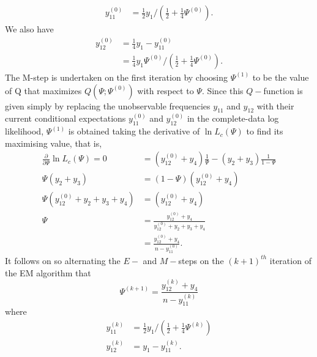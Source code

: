 \begin{exam}
\begin{align*}
        y_{11}^{(0)} & = \frac{1}{2} y_{1} / \left( \frac{1}{2} + \frac{1}{4} \Psi^{(0)} \right).
    \end{align*}
    We also have
    \begin{align*}
        y_{12}^{(0)} & = \frac{1}{4} y_1 - y_{11}^{(0)}                                                      \\
                     & = \frac{1}{4} y_{1} \Psi^{(0)} / \left( \frac{1}{2} + \frac{1}{4} \Psi^{(0)} \right).
    \end{align*}
    The M-step is undertaken on the first iteration by choosing $\Psi^{(1)}$ to be the value of Q that maximizes $Q \left( \Psi ; \Psi^{(0)} \right)$ with respect to $\Psi$. Since this $Q-$function is given simply by replacing the unobservable frequencies $y_{11}$ and $y_{12}$ with their current conditional expectations $y_{11}^{(0)}$ and $y_{12}^{(0)}$ in the complete-data log likelihood, $\Psi^{(1)}$ is obtained taking the derivative of $\ln L_c (\Psi)$ to find its maximising value, that is,
    \begin{align*}
        \frac{\partial}{\partial \Psi} \ln L_c (\Psi) = 0  \
         & = \left( y_{12}^{(0)} + y_4 \right) \frac{1}{\Psi} - \left( y_2 + y_3 \right) \frac{1}{1-\Psi} \\
        \Psi \left( y_2 + y_3 \right)
         & = (1-\Psi) \left( y_{12}^{(0)} + y_4 \right)                                                   \\
        \Psi \left( y_{12}^{(0)} + y_2 + y_3 + y_4 \right)
         & = \left( y_{12}^{(0)} + y_4 \right)                                                            \\
        \Psi
         & = \frac{y_{12}^{(0)} + y_4}{y_{12}^{(0)} + y_2 + y_3 + y_4}                                    \\
         & = \frac{y_{12}^{(0)} + y_4}{n - y_{11}^{(0)}}.
    \end{align*}
    It follows on so alternating the $E-$ and $M-$steps on the $(k+1)^{th}$ iteration of the EM algorithm that
    \begin{equation*}
        \Psi^{(k+1)} = \frac{y_{12}^{(k)} + y_4}{n - y_{11}^{(k)}}
    \end{equation*}
    where
    \begin{align*}
        y_{11}^{(k)} & = \frac{1}{2} y_1 / \left( \frac{1}{2} + \frac{1}{4} \Psi^{(k)} \right) \\
        y_{12}^{(k)} & = y_1 - y_{11}^{(k)}.
    \end{align*}
\end{exam}

